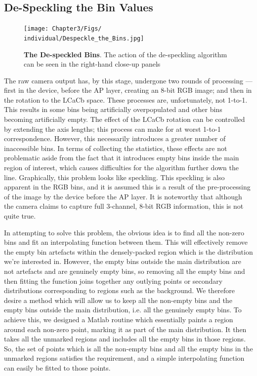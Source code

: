 \subsection{De-Speckling the Bin Values}\label{sec:DeSpeckle}

\begin{figure}[h!]
  \centering
    \texttt{[image: Chapter3/Figs/\\individual/Despeckle\_the\_Bins.jpg]}
        \caption{\textbf{The De-speckled Bins}. The action of the de-speckling algorithm can be seen in the right-hand close-up panels}  \label{fig:Despeckle_the_Bins}
    \end{figure}
    
The raw camera output has, by this stage, undergone two rounds of processing --- first in the device, before the AP layer, creating an 8-bit RGB image; and then in the rotation to the LCaCb space. These processes are, unfortunately, not 1-to-1. This results in some bins being artificially overpopulated and other bins becoming artificially empty. The effect of the LCaCb rotation can be controlled by extending the axis lengths; this process can make for at worst 1-to-1 correspondence. However, this necessarily introduces a greater number of inaccessible bins. In terms of collecting the statistics, these effects are not problematic aside from the fact that it introduces empty bins inside the main region of interest, which causes difficulties for the algorithm further down the line. Graphically, this problem looks like speckling. This speckling is also apparent in the RGB bins, and it is assumed this is a result of the pre-processing of the image by the device before the AP layer. It is noteworthy that although the camera claims to capture full 3-channel, 8-bit RGB information, this is not quite true. 

In attempting to solve this problem, the obvious idea is to find all the non-zero bins and fit an interpolating function between them. This will effectively remove the empty bin artefacts within the densely-packed region which is the distribution we're interested in. However, the empty bins outside the main distribution are not artefacts and are genuinely empty bins, so removing all the empty bins and then fitting the function joins together any outlying points or secondary distributions corresponding to regions such as the background. We therefore desire a method which will allow us to keep all the non-empty bins and the empty bins outside the main distribution, i.e. all the genuinely empty bins. To achieve this, we designed a Matlab routine which essentially paints a region around each non-zero point, marking it as part of the main distribution. It then takes all the unmarked regions and includes all the empty bins in those regions. So, the set of points which is all the non-empty bins and all the empty bins in the unmarked regions satisfies the requirement, and a simple interpolating function can easily be fitted to those points.





